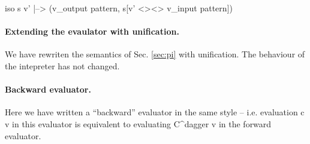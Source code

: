 \documentclass[preprint]{sigplanconf}
\begin{document}
{{{ iso s v' |--> (v_{output pattern}, s[v' <><> v_{input pattern}]) }}


\paragraph{Extending the evaulator with unification.} 
We have rewriten the semantics of Sec. \ref{sec:pi} with
unification. The behaviour of the intepreter has not changed.


\paragraph{Backward evaluator.}
Here we have written a ``backward'' evaluator in the same style --
i.e. evaluation {{c v}} in this evaluator is equivalent to evaluating
{{C^{dagger} v}} in the forward evaluator.


}
\end{document}
